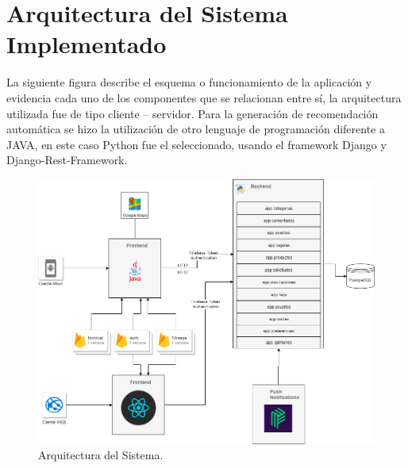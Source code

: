 \documentclass[12pt,letterpaper,openany]{book}
\begin{document}
\section{Arquitectura del Sistema Implementado}
La siguiente figura describe el esquema o funcionamiento de la aplicación y evidencia cada uno de los componentes que se relacionan entre sí, la arquitectura utilizada fue de tipo cliente – servidor. Para la generación de recomendación automática se hizo la utilización de otro lenguaje de programación diferente a JAVA, en este caso Python fue el seleccionado, usando el framework Django y Django-Rest-Framework.
\begin{figure}[H]
\begin{center}
\includegraphics[width=13cm]{./imagenes/arquitectura}
\caption{Arquitectura del Sistema.}
\end{center}
\end{figure}
\end{document}
